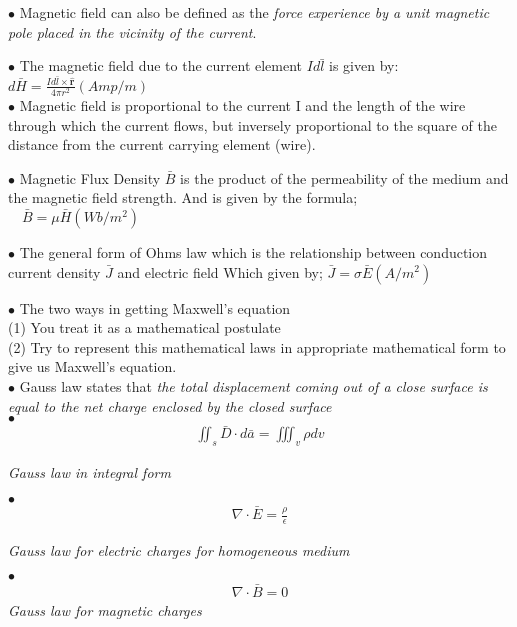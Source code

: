 	$\bullet$ Magnetic field can also be defined as the \emph{force experience by a unit magnetic pole placed in the vicinity of the current}.
	
	$\bullet$ The magnetic field due to the current element $Id\bar{l}$ is given by:
	$\boxed{d\bar{H}= \frac{Id\bar{l} \times \hat{\textbf{r}}}{4\pi r^{2}}} (Amp/m)$ \\
	
	$\bullet$ Magnetic field is proportional to the current I and the length of the wire through which the current flows, but inversely proportional to the square of the distance from the current carrying element (wire).
	
	$\bullet$ Magnetic Flux Density $\bar{B}$ is the product of the permeability of the medium and the magnetic field strength. And is given by the formula;\\ $\quad\boxed{\bar{B} = \mu\bar{H}} (Wb/m^{2})$
	
	$\bullet$ The general form of Ohms law which is the relationship between conduction current density $\bar{J}$ and electric field Which given by; $\boxed{\bar{J} = \sigma\bar{E}} (A/m^{2})$
	
	$ \bullet $ The two ways in getting Maxwell's equation \\
	(1)	You treat it as a mathematical postulate\\
	(2)	Try to represent this mathematical laws in appropriate mathematical form to give us Maxwell's equation.\\
	
	$ \bullet $ Gauss law states that \emph{the total displacement coming out of a close surface is equal to the net charge enclosed by the closed surface}\\
	
	$ \bullet $ \begin{align*}
	\iint_s\bar{D}\cdot{d\bar{a}} = \iiint_v\rho dv
	\end{align*}
	\begin{center}
		\emph{Gauss law in integral form}
	\end{center}
	
$ \bullet $	\begin{align*} 
	\nabla \cdot \bar{E} = \frac{\rho}{\epsilon}
	\end{align*} 
	\begin{center}
		\emph{Gauss law for electric charges for homogeneous medium}
	\end{center} 

$ \bullet $ \begin{align*}
\nabla \cdot \bar{B} = 0
\end{align*}
\emph{Gauss law for magnetic charges}

